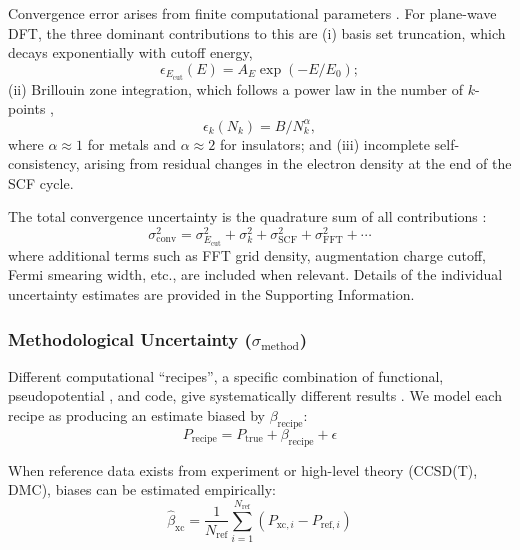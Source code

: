 \documentclass[prb,twocolumn,superscriptaddress,amsmath,amssymb,longbibliography]{revtex4-2}
\newcommand{\Ecut}{E_{\mathrm{cut}}}
\newcommand{\xc}{\mathrm{xc}}
\newcommand{\conv}{\mathrm{conv}}
\newcommand{\meth}{\mathrm{method}}
\newcommand{\Nk}{N_k}
\begin{document}
Convergence error arises from finite computational 
parameters \cite{Payne1992}. For plane-wave DFT, the three dominant 
contributions to this are (i) basis set truncation, which decays exponentially with 
cutoff energy,
\begin{equation}
    \epsilon_{\Ecut}(E) = A_E \exp\left(-E / E_0\right);
    \label{eq:cutoff_error}
\end{equation}
(ii) Brillouin zone integration, which follows a power law in the number of 
$k$-points \cite{Wisesa2016,Monkhorst1976},
\begin{equation}
    \epsilon_k(\Nk) = B / \Nk^{\alpha},
    \label{eq:kpoint_error}
\end{equation}
where $\alpha \approx 1$ for metals and $\alpha \approx 2$ for insulators; and (iii) 
 incomplete self-consistency, arising from residual changes in the electron density at the end of the SCF cycle.
 
The total convergence uncertainty is the quadrature sum of all 
contributions \cite{JCGM2008_GUM}:
\begin{equation}
    \sigma_\conv^2 = \sigma_{\Ecut}^2 + \sigma_k^2 + \sigma_{\mathrm{SCF}}^2 
    + \sigma_{\mathrm{FFT}}^2 + \cdots
    \label{eq:total_convergence}
\end{equation}
where additional terms such as FFT grid density, augmentation charge cutoff, Fermi 
smearing width, etc., are included when relevant. Details of the individual uncertainty estimates are provided in the Supporting  Information.

\subsubsection{Methodological Uncertainty ($\sigma_\meth$)}

Different computational ``recipes'', a specific combination of functional, 
pseudopotential \cite{Blochl1994_PAW,Garrity2014_GBRV}, and code, give 
systematically different results \cite{Lejaeghere2014}. We model 
each recipe as producing an estimate biased by $\beta_{\mathrm{recipe}}$:
\begin{equation}
    P_{\mathrm{recipe}} = P_{\mathrm{true}} + \beta_{\mathrm{recipe}} + \epsilon
    \label{eq:recipe_bias}
\end{equation}

When reference data exists from experiment or high-level theory (CCSD(T), DMC), 
biases can be estimated empirically:
\begin{equation}
    \hat{\beta}_{\xc} = \frac{1}{N_{\mathrm{ref}}} \sum_{i=1}^{N_{\mathrm{ref}}} 
    \left( P_{\xc,i} - P_{\mathrm{ref},i} \right)
    \label{eq:bias_estimate}
\end{equation}
\end{document}

